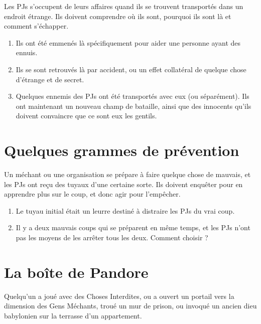 \begin{multicols}{2}

Les PJs s'occupent de leurs affaires quand ils se trouvent transportés dans un endroit étrange. Ils doivent comprendre où ils sont, pourquoi ils sont là et comment s'échapper.

\themes
\begin{enumerate}
\item Ils ont été emmenés là spécifiquement pour aider une personne ayant des ennuis.
\item Ils se sont retrouvés là par accident, ou un effet collatéral de quelque chose d'étrange  et de secret.
\item Quelques ennemis des PJs ont été transportés avec eux (ou séparément). Ils ont maintenant un nouveau champ de bataille, ainsi que des innocents qu'ils doivent convaincre que ce sont eux les gentils.
\end{enumerate}

\section{Quelques grammes de prévention}
\hypertarget{prevention}{}


Un méchant ou une organisation se prépare à faire quelque chose de mauvais, et les PJs ont reçu des tuyaux d'une certaine sorte. Ils doivent enquêter pour en apprendre plus sur le coup, et donc agir pour l'empêcher.

\themes
\begin{enumerate}
\item Le tuyau initial était un leurre destiné à distraire les PJs du vrai coup.
\item Il y a deux mauvais coups qui se préparent en même temps, et les PJs n'ont pas les moyens de les arrêter tous les deux. Comment choisir ?
\end{enumerate}

\section{La boîte de Pandore}
\hypertarget{pandore}{}


Quelqu'un a joué avec des Choses Interdites, ou a ouvert un portail vers la dimension des Gens Méchants, troué un mur de prison, ou invoqué un ancien dieu babylonien sur la terrasse d'un appartement.


\end{multicols}
